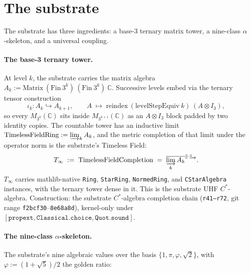 \documentclass[11pt,a4paper]{amsart}
\theoremstyle{plain}
\theoremstyle{definition}
\begin{document}
\section{The substrate}\label{sec:substrate}

The substrate has three ingredients: a base-3 ternary matrix tower, a nine-class $\alpha$-skeleton, and a universal coupling.

\paragraph{The base-3 ternary tower.} At level $k$, the substrate carries the matrix algebra $A_k := \mathrm{Matrix}~(\mathrm{Fin}~3^k)~(\mathrm{Fin}~3^k)~\mathbb{C}$. Successive levels embed via the ternary tensor construction
\[
\iota_k \colon A_k \hookrightarrow A_{k+1}, \qquad A \;\longmapsto\; \mathrm{reindex}~(\mathrm{levelStepEquiv}~k)~(A \otimes I_3),
\]
so every $M_{3^k}(\mathbb{C})$ sits inside $M_{3^{k+1}}(\mathbb{C})$ as an $A \otimes I_3$ block padded by two identity copies. The countable tower has an inductive limit $\mathrm{TimelessFieldRing} := \varinjlim_k A_k$, and the metric completion of that limit under the operator norm is the substrate's Timeless Field:
\[
T_\infty \;:=\; \mathrm{TimelessFieldCompletion} \;=\; \overline{\varinjlim_k A_k}^{\|\cdot\|_{\textsf{op}}}.
\]
$T_\infty$ carries mathlib-native \texttt{Ring}, \texttt{StarRing}, \texttt{NormedRing}, and \texttt{CStarAlgebra} instances, with the ternary tower dense in it. This is the substrate UHF $C^*$-algebra. Construction: the substrate $C^*$-algebra completion chain (\texttt{r41--r72}, git range \texttt{f2bcf30}--\texttt{8e68a8d}), kernel-only under $[\texttt{propext}, \texttt{Classical.choice}, \texttt{Quot.sound}]$.

\paragraph{The nine-class $\alpha$-skeleton.} The substrate's nine algebraic values over the basis $\{1, \pi, \varphi, \sqrt{2}\}$, with $\varphi := (1+\sqrt{5})/2$ the golden ratio:
\end{document}
